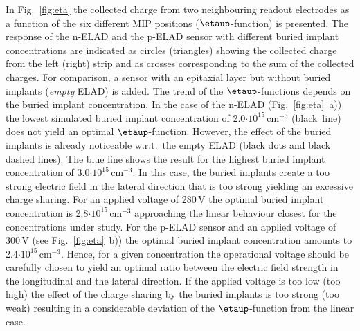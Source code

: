 \documentclass[a4paper,11pt]{article}
\begin{document}
In Fig.~\ref{fig:eta} the collected charge from two neighbouring readout electrodes as a function of the six different MIP positions ($\etaup$-function) is presented.
The response of the n-ELAD and the p-ELAD sensor with different buried implant concentrations are indicated as
 circles (triangles) showing the collected charge from the left (right) strip
 and as crosses corresponding to the sum of the collected charges. 
For comparison, a sensor with an epitaxial layer but without buried implants (\textit{empty} ELAD) is added. 
The trend of the $\etaup$-functions depends on the buried implant concentration.
In the case of the n-ELAD (Fig.~\ref{fig:eta}~a)) the lowest simulated buried implant concentration of 2.0$\mathrm{\cdot10^{15}\,cm^{-3}}$ (black~line) does not yield an optimal $\etaup$-function.
However, the effect of the buried implants is already noticeable w.r.t.\ the empty ELAD (black dots and black dashed lines). 
The blue line shows the result for the highest buried implant concentration of 3.0$\mathrm{\cdot10^{15}\,cm^{-3}}$. 
In this case, the buried implants create a too strong electric field in the lateral direction that is too strong yielding an excessive charge sharing.
For an applied voltage of 280\,V the optimal buried implant concentration is 2.8$\mathrm{\cdot10^{15}\,cm^{-3}}$ approaching the linear behaviour closest for the concentrations under study.
For the p-ELAD sensor and an applied voltage of 300\,V (see Fig.~\ref{fig:eta}~b)) the optimal buried implant concentration amounts to 2.4$\mathrm{\cdot10^{15}\,cm^{-3}}$.
Hence, for a given concentration the operational voltage should be carefully chosen to yield an optimal ratio between the electric field strength in the longitudinal and the lateral direction. 
If the applied voltage is too low (too high) the effect of the charge sharing by the buried implants is too strong (too weak) resulting in a considerable deviation of the $\etaup$-function from the linear case.
\end{document}
